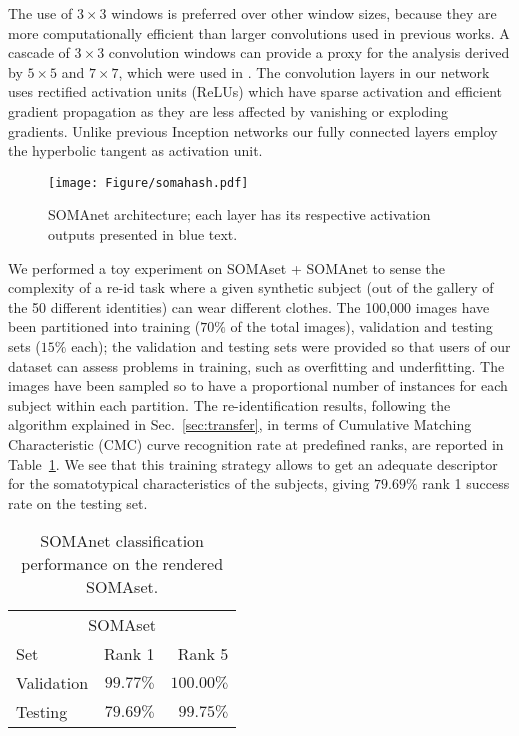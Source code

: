 \documentclass[10pt,journal,letterpaper,compsoc]{IEEEtran}
\begin{document}
The use of $3\times3$ windows is preferred over other window sizes, because they are more computationally efficient than larger convolutions used in previous works. A cascade of $3\times3$ convolution windows can provide a proxy for the analysis derived by $5\times5$ and $7\times7$, which were used in \cite{googlenet,batch_norm}. The convolution layers in our network uses rectified activation units (ReLUs) \cite{glorot2011deep} which have sparse activation and efficient gradient propagation as they are less affected by vanishing or exploding gradients. Unlike previous Inception networks \cite{googlenet,batch_norm,incep3} our fully connected layers employ the hyperbolic tangent as activation unit.


\begin{figure}[!htb]
\centering
   \texttt{[image: Figure/somahash.pdf]}
    \caption{SOMAnet architecture; each layer has its respective activation outputs presented in blue text. }
    \label{fig:final_network}
\end{figure}


 We performed a toy experiment on SOMAset + SOMAnet to sense the complexity of a re-id task where a given synthetic subject (out of the gallery of the 50 different identities) can wear different clothes. The 100,000 images have been partitioned into training ($70\%$ of the total images), validation and testing sets ($15\%$ each); the validation and testing sets were provided so that users of our dataset can assess problems in training, such as overfitting and underfitting. The images have been sampled so to have a proportional number of instances for each subject within each partition. The re-identification results, following the algorithm explained in Sec.~\ref{sec:transfer}, in terms of Cumulative Matching Characteristic (CMC) curve recognition rate at predefined ranks, are reported in Table~\ref{tab:somaset}.
We see that this training strategy allows
 to get an adequate descriptor for the somatotypical characteristics of the subjects, giving $79.69\%$ rank 1 success rate on the testing set.



\begin{table}[!hb]
\scriptsize
\centering
  \begin{tabular}{lrr}
    \toprule
    \multicolumn{3}{c}{SOMAset} \\
    \cmidrule(r){1-3}
    Set             &  Rank 1    & Rank 5 \\
    \midrule
    Validation      & $99.77\%$  & $100.00\%$ \\
    Testing         & $79.69\%$  & $99.75\%$ \\
    \bottomrule
  \end{tabular}
\caption{SOMAnet classification performance on the rendered SOMAset.}
\label{tab:somaset} \vspace{-0.3cm}
\end{table}
\end{document}
